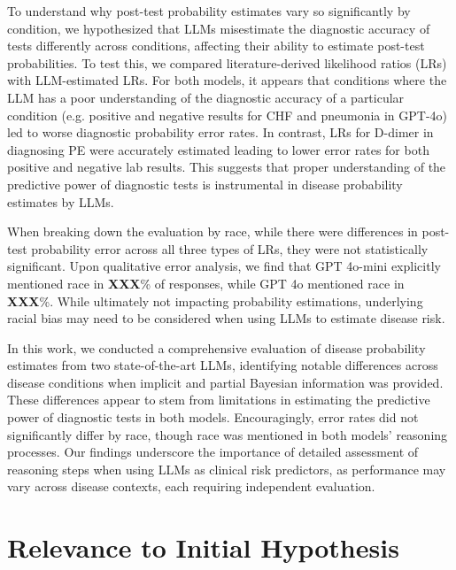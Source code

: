 To understand why post-test probability estimates vary so significantly by condition, we hypothesized that LLMs misestimate the diagnostic accuracy of tests differently across conditions, affecting their ability to estimate post-test probabilities. To test this, we compared literature-derived likelihood ratios (LRs) with LLM-estimated LRs. For both models, it appears that conditions where the LLM has a poor understanding of the diagnostic accuracy of a particular condition (e.g. positive and negative results for CHF and pneumonia in GPT-4o) led to worse diagnostic probability error rates. In contrast, LRs for D-dimer in diagnosing PE were accurately estimated leading to lower error rates for both positive and negative lab results. This suggests that proper understanding of the predictive power of diagnostic tests is instrumental in disease probability estimates by LLMs. 

When breaking down the evaluation by race, while there were differences in post-test probability error across all three types of LRs, they were not statistically significant. Upon qualitative error analysis, we find that GPT 4o-mini explicitly mentioned race in \textbf{XXX}\% of responses, while GPT 4o mentioned race in \textbf{XXX}\%. While ultimately not impacting probability estimations, underlying racial bias may need to be considered when using LLMs to estimate disease risk. 

In this work, we conducted a comprehensive evaluation of disease probability estimates from two state-of-the-art LLMs, identifying notable differences across disease conditions when implicit and partial Bayesian information was provided. These differences appear to stem from limitations in estimating the predictive power of diagnostic tests in both models. Encouragingly, error rates did not significantly differ by race, though race was mentioned in both models' reasoning processes. Our findings underscore the importance of detailed assessment of reasoning steps when using LLMs as clinical risk predictors, as performance may vary across disease contexts, each requiring independent evaluation.

\section{Relevance to Initial Hypothesis}
